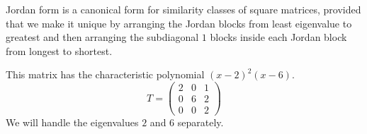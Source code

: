 Jordan form is a canonical form for similarity classes of square
matrices,
provided that we make it unique by arranging the
Jordan blocks from least eigenvalue to greatest and then
arranging the subdiagonal $1$ blocks inside each Jordan block from 
longest to shortest.

\begin{example} \label{ex:FirstJordForm}
This matrix 
has the characteristic polynomial \( (x-2)^2(x-6) \).
\begin{equation*}
   T=
   \begin{pmatrix}
     2  &0  &1  \\
     0  &6  &2  \\
     0  &0  &2
   \end{pmatrix}
\end{equation*}
We will handle the eigenvalues $2$ and $6$ separately.


\end{example}
